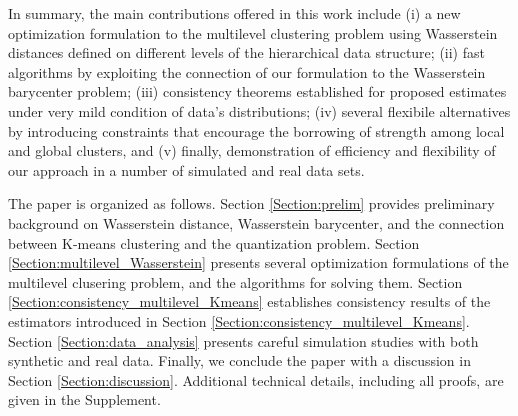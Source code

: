 In summary, the main contributions offered in this work include (i) 
a new optimization formulation to the multilevel clustering problem using Wasserstein
distances defined on different levels of the hierarchical data structure; (ii) 
fast algorithms by exploiting the connection of our formulation to the Wasserstein 
barycenter problem; (iii) consistency theorems established for proposed
estimates under very mild condition of data's distributions; 
(iv) several flexibile alternatives by introducing constraints that encourage the borrowing
of strength among local and global clusters, and (v) finally, demonstration of 
efficiency and flexibility of our approach in a number of simulated and real data sets.  

The paper is organized as follows. Section \ref{Section:prelim} provides preliminary 
background on Wasserstein distance, Wasserstein barycenter, and the connection between 
K-means clustering and the quantization problem. Section 
\ref{Section:multilevel_Wasserstein} presents
several optimization formulations of the multilevel clusering problem, and the algorithms
for solving them. Section
\ref{Section:consistency_multilevel_Kmeans} establishes consistency results of the estimators
introduced in Section \ref{Section:consistency_multilevel_Kmeans}. Section 
\ref{Section:data_analysis} presents careful simulation studies with both synthetic and real 
data. Finally, we conclude the paper with a discussion in Section \ref{Section:discussion}.
Additional technical details, including all proofs, are given in the Supplement.
